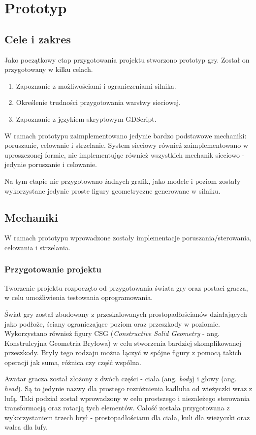 \chapter{Prototyp}\label{ch:prototype}
\section{Cele i zakres}
Jako początkowy etap przygotowania projektu stworzono prototyp gry. Został on przygotowany w kilku celach.
\begin{enumerate}
    \item Zapoznanie z możliwościami i ograniczeniami silnika. 
    \item Określenie trudności przygotowania warstwy sieciowej.
    \item Zapoznanie z językiem skryptowym GDScript. 
\end{enumerate}

W ramach prototypu zaimplementowano jedynie bardzo podstawowe mechaniki: poruszanie, celowanie i strzelanie. System sieciowy również zaimplementowano w uproszczonej formie, nie implementując również wszystkich mechanik sieciowo - jedynie poruszanie i celowanie.

Na tym etapie nie przygotowano żadnych grafik, jako modele i poziom zostały wykorzystane jedynie proste figury geometryczne generowane w silniku.

\section{Mechaniki}
W ramach prototypu wprowadzone zostały implementacje poruszania/sterowania, celowania i strzelania.

\subsection{Przygotowanie projektu}
Tworzenie projektu rozpoczęto od przygotowania świata gry oraz postaci gracza, w celu umożliwienia testowania oprogramowania. 

Świat gry został zbudowany z przeskalowanych prostopadłościanów działających jako podłoże, ściany ograniczające poziom oraz przeszkody w poziomie. Wykorzystano również figury CSG (\emph{Constructive Solid Geometry} - ang. Konstrulcyjna Geometria Bryłowa) w celu stworzenia bardziej skomplikowanej przeszkody. Bryły tego rodzaju można łączyć w spójne figury z pomocą takich operacji jak suma, różnica czy część wspólna.

Awatar gracza został złożony z dwóch części - ciała (ang. \emph{body}) i głowy (ang. \emph{head}). Są to jedynie nazwy dla prostego rozróżnienia kadłuba od wieżyczki wraz z lufą. Taki podział został wprowadzony w celu prostszego i niezależego sterowania transformacją oraz rotacją tych elementów. Całość została przygotowana z wykorzystaniem trzech brył - prostopadłościanu dla ciała, kuli dla wieżyczki oraz walca dla lufy.


